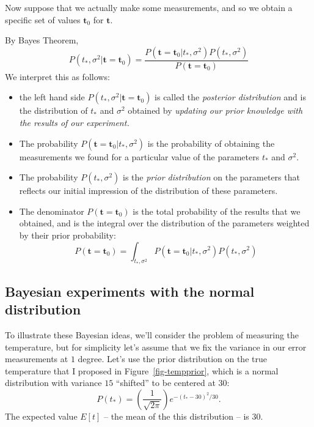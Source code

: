 \documentclass[
  11pt,
  letterpaper,
]{scrbook}
\providecommand{\tightlist}{%
  \setlength{\itemsep}{0pt}\setlength{\parskip}{0pt}}\usepackage{longtable,booktabs,array}
\theoremstyle{plain}
\theoremstyle{plain}
\theoremstyle{remark}
\begin{document}
Now suppose that we actually make some measurements, and so we obtain a
specific set of values \(\mathbf{t}_0\) for \(\mathbf{t}\).

By Bayes Theorem, \[
P(t_{*},\sigma^2|\mathbf{t}=\mathbf{t}_0) = \frac{P(\mathbf{t}=\mathbf{t}_0|t_{*},\sigma^2)P(t_{*},\sigma^2)}{P(\mathbf{t}=\mathbf{t}_0)}
\] We interpret this as follows:

\begin{itemize}
\tightlist
\item
  the left hand side \(P(t_{*},\sigma^2|\mathbf{t}=\mathbf{t}_0)\) is
  called the \emph{posterior distribution} and is the distribution of
  \(t_{*}\) and \(\sigma^2\) obtained by \emph{updating our prior
  knowledge with the results of our experiment.}
\item
  The probability \(P(\mathbf{t}=\mathbf{t}_{0}|t_{*},\sigma^2)\) is the
  probability of obtaining the measurements we found for a particular
  value of the parameters \(t_{*}\) and \(\sigma^2\).
\item
  The probability \(P(t_{*},\sigma^2)\) is the \emph{prior distribution}
  on the parameters that reflects our initial impression of the
  distribution of these parameters.
\item
  The denominator \(P(\mathbf{t}=\mathbf{t}_{0})\) is the total
  probability of the results that we obtained, and is the integral over
  the distribution of the parameters weighted by their prior
  probability: \[
  P(\mathbf{t}=\mathbf{t}_{0})=\int_{t_{*},\sigma^2}P(\mathbf{t}=\mathbf{t}_{0}|t_{*},\sigma^2)P(t_{*},\sigma^2)
  \]
\end{itemize}

\hypertarget{bayesian-experiments-with-the-normal-distribution}{%
\subsection{Bayesian experiments with the normal
distribution}\label{bayesian-experiments-with-the-normal-distribution}}

To illustrate these Bayesian ideas, we'll consider the problem of
measuring the temperature, but for simplicity let's assume that we fix
the variance in our error measurements at \(1\) degree. Let's use the
prior distribution on the true temperature that I proposed in
Figure~\ref{fig-tempprior}, which is a normal distribution with variance
\(15\) ``shifted'' to be centered at \(30\): \[
P(t_*)=\left(\frac{1}{\sqrt{2\pi}}\right)e^{-(t_*-30)^2/30}.
\] The expected value \(E[t]\) -- the mean of the this distribution --
is \(30\).
\end{document}
